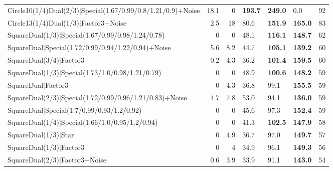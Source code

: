 \begin{tabular}{lrrlllr}
 Circle10(1/4)Dual(2/3)|Special(1.67/0.99/0.8/1.21/0.9)+Noise   &         18.1 &            0   & \textbf{193.7} & \textbf{249.0} & 0.0            &           92 \\
 Circle13(1/4)Dual(1/3)|Factor3+Noise                           &          2.5 &           18   & 80.6           & \textbf{151.9} & \textbf{165.0} &           83 \\
 SquareDual(1/3)|Special(1.67/0.99/0.98/1.24/0.78)              &          0   &            0   & 48.1           & \textbf{116.1} & \textbf{148.7} &           62 \\
 SquareDual|Special(1.72/0.99/0.94/1.22/0.94)+Noise             &          5.6 &            8.2 & 44.7           & \textbf{105.1} & \textbf{139.2} &           60 \\
 SquareDual(3/4)|Factor3                                        &          0.2 &            4.3 & 36.2           & \textbf{101.4} & \textbf{159.5} &           60 \\
 SquareDual(1/3)|Special(1.73/1.0/0.98/1.21/0.79)               &          0   &            0   & 48.9           & \textbf{100.6} & \textbf{148.2} &           59 \\
 SquareDual|Factor3                                             &          0   &            4.3 & 36.8           & 99.1           & \textbf{155.5} &           59 \\
 SquareDual(2/3)|Special(1.72/0.99/0.96/1.21/0.83)+Noise        &          4.7 &            7.8 & 53.0           & 94.1           & \textbf{136.0} &           59 \\
 SquareDual|Special(1.7/0.99/0.93/1.2/0.92)                     &          0   &            0   & 45.6           & 97.3           & \textbf{152.4} &           59 \\
 SquareDual(1/4)|Special(1.66/1.0/0.95/1.2/0.94)                &          0   &            0   & 41.3           & \textbf{102.5} & \textbf{147.9} &           58 \\
 SquareDual(1/3)|Star                                           &          0   &            4.9 & 36.7           & 97.0           & \textbf{149.7} &           57 \\
 SquareDual(1/3)|Factor3                                        &          0   &            4   & 34.9           & 96.1           & \textbf{149.3} &           56 \\
 SquareDual(2/3)|Factor3+Noise                                  &          0.6 &            3.9 & 33.9           & 91.1           & \textbf{143.0} &           54 \\

\end{tabular}
